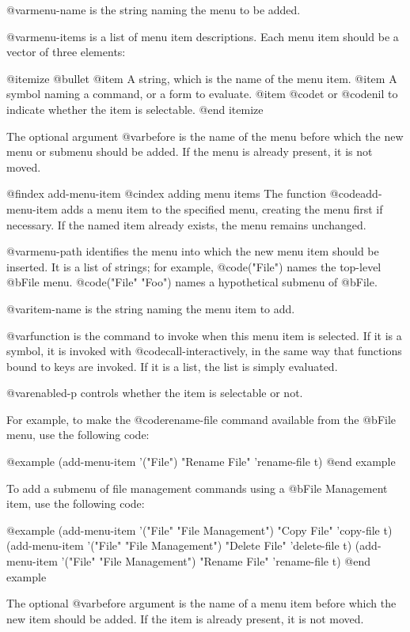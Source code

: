 {{@var{menu-name} is the string naming the menu to be added.  

@var{menu-items} is a list of menu item descriptions.  Each menu item
should be a vector of three elements:

@itemize @bullet
@item 
A string, which is the name of the menu item.
@item 
A symbol naming a command, or a form to evaluate.
@item 
@code{t} or @code{nil} to indicate whether the item is selectable.
@end itemize

The optional argument @var{before} is the name of the menu before which
the new menu or submenu should be added.  If the menu is already
present, it is not moved.

@findex add-menu-item
@cindex adding menu items
The function @code{add-menu-item} adds a menu item to the specified
menu, creating the menu first if necessary.  If the named item already
exists, the menu remains unchanged.

@var{menu-path} identifies the menu into which the new menu item should
be inserted.  It is a list of strings; for example, @code{("File")}
names the top-level @b{File} menu.  @code{("File" "Foo")} names a
hypothetical submenu of @b{File}.

@var{item-name} is the string naming the menu item to add.

@var{function} is the command to invoke when this menu item is selected.
If it is a symbol, it is invoked with @code{call-interactively}, in the
same way that functions bound to keys are invoked.  If it is a list, the
list is simply evaluated.

@var{enabled-p} controls whether the item is selectable or not.

For example, to make the @code{rename-file} command available from the
@b{File} menu, use the following code:

@example
(add-menu-item '("File") "Rename File" 'rename-file t)
@end example

To add a submenu of file management commands using a @b{File Management}
item, use the following code: 

@example
(add-menu-item '("File" "File Management") "Copy File" 'copy-file t)
(add-menu-item '("File" "File Management") "Delete File" 'delete-file t)
(add-menu-item '("File" "File Management") "Rename File" 'rename-file t)
@end example

The optional @var{before} argument is the name of a menu item before
which the new item should be added.  If the item is already present, it
is not moved.

}}
